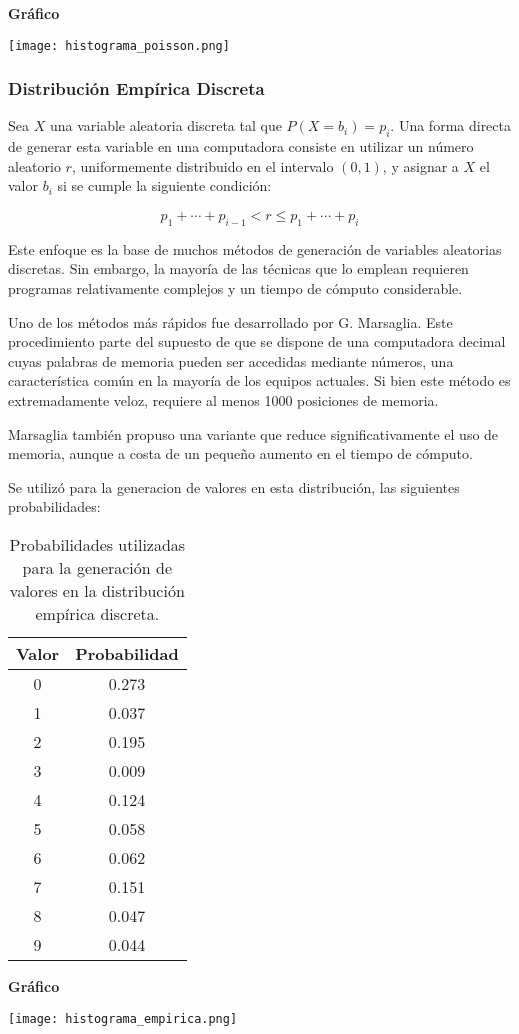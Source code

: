 \documentclass[11pt]{article}
\begin{document}
\noindent\textbf{Gráfico\newline}
\begin{center}
\texttt{[image: histograma\_poisson.png]}
\end{center}

\subsubsection{Distribución Empírica Discreta}
Sea \( X \) una variable aleatoria discreta tal que \( P(X = b_i) = p_i \).  
Una forma directa de generar esta variable en una computadora consiste en utilizar un número aleatorio \( r \), uniformemente distribuido en el intervalo \( (0, 1) \), y asignar a \( X \) el valor \( b_i \) si se cumple la siguiente condición:

\begin{equation}
p_1 + \cdots + p_{i-1} < r \leq p_1 + \cdots + p_i
\end{equation}


Este enfoque es la base de muchos métodos de generación de variables aleatorias discretas. Sin embargo, la mayoría de las técnicas que lo emplean requieren programas relativamente complejos y un tiempo de cómputo considerable.

Uno de los métodos más rápidos fue desarrollado por G. Marsaglia. Este procedimiento parte del supuesto de que se dispone de una computadora decimal cuyas palabras de memoria pueden ser accedidas mediante números, una característica común en la mayoría de los equipos actuales. Si bien este método es extremadamente veloz, requiere al menos 1000 posiciones de memoria.

Marsaglia también propuso una variante que reduce significativamente el uso de memoria, aunque a costa de un pequeño aumento en el tiempo de cómputo.

Se utilizó para la generacion de valores en esta distribución, las siguientes probabilidades:

\begin{table}[H]
\centering
\begin{tabular}{|c|c|}
\hline
\textbf{Valor} & \textbf{Probabilidad} \\
\hline
0 & 0.273 \\
1 & 0.037 \\
2 & 0.195 \\
3 & 0.009 \\
4 & 0.124 \\
5 & 0.058 \\
6 & 0.062 \\
7 & 0.151 \\
8 & 0.047 \\
9 & 0.044 \\
\hline
\end{tabular}
\caption{Probabilidades utilizadas para la generación de valores en la distribución empírica discreta.}
\label{tab:empirica}
\end{table}

\noindent\textbf{Gráfico\newline}
\begin{center}
\texttt{[image: histograma\_empirica.png]}

\end{center}
\end{document}

